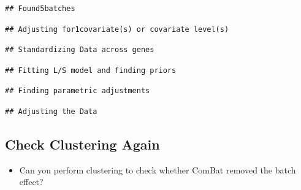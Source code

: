 \documentclass[
]{article}
\newenvironment{Shaded}{\begin{snugshade}}{\end{snugshade}}
\newcommand{\CommentTok}[1]{\textcolor[rgb]{0.56,0.35,0.01}{\textit{#1}}}
\newcommand{\DataTypeTok}[1]{\textcolor[rgb]{0.13,0.29,0.53}{#1}}
\newcommand{\DecValTok}[1]{\textcolor[rgb]{0.00,0.00,0.81}{#1}}
\newcommand{\KeywordTok}[1]{\textcolor[rgb]{0.13,0.29,0.53}{\textbf{#1}}}
\newcommand{\NormalTok}[1]{#1}
\newcommand{\OperatorTok}[1]{\textcolor[rgb]{0.81,0.36,0.00}{\textbf{#1}}}
\newcommand{\StringTok}[1]{\textcolor[rgb]{0.31,0.60,0.02}{#1}}
\providecommand{\tightlist}{%
  \setlength{\itemsep}{0pt}\setlength{\parskip}{0pt}}
\begin{document}
\begin{verbatim}
## Found5batches
\end{verbatim}

\begin{verbatim}
## Adjusting for1covariate(s) or covariate level(s)
\end{verbatim}

\begin{verbatim}
## Standardizing Data across genes
\end{verbatim}

\begin{verbatim}
## Fitting L/S model and finding priors
\end{verbatim}

\begin{verbatim}
## Finding parametric adjustments
\end{verbatim}

\begin{verbatim}
## Adjusting the Data
\end{verbatim}

\hypertarget{check-clustering-again}{%
\subsection{Check Clustering Again}\label{check-clustering-again}}

\begin{itemize}
\tightlist
\item
  Can you perform clustering to check whether ComBat removed the batch
  effect?
\end{itemize}

\begin{Shaded}
\end{Shaded}
\end{document}
